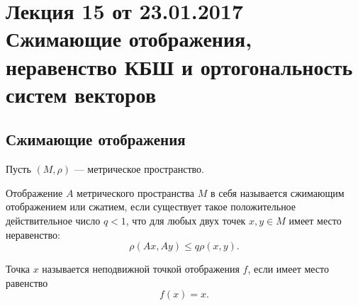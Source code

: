 \section{Лекция 15 от 23.01.2017 \\Сжимающие отображения, неравенство КБШ и ортогональность систем векторов}

\subsection{Сжимающие отображения}

Пусть  $(M, \rho)$ --- метрическое пространство.

\begin{Def}
Отображение  $A$ метрического пространства  $M$ в себя называется сжимающим отображением или сжатием, если существует такое положительное действительное число  $q < 1$, что для любых двух точек  $x,y \in M$ имеет место неравенство:
 $$\rho(Ax, Ay) \le q \rho(x, y).$$
\end{Def}

\begin{Def}
Точка $x$ называется неподвижной точкой отображения $f$, если имеет место равенство
$$f(x) = x.$$
\end{Def}


